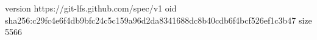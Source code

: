 version https://git-lfs.github.com/spec/v1
oid sha256:c29fc4e6f4db9bfc24c5c159a96d2da8341688dc8b40cdb6f4bcf526ef1c3b47
size 5566
